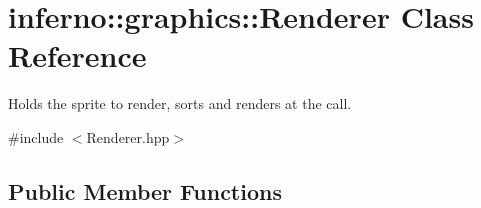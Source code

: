 \hypertarget{classinferno_1_1graphics_1_1_renderer}{}\section{inferno\+:\+:graphics\+:\+:Renderer Class Reference}
\label{classinferno_1_1graphics_1_1_renderer}


Holds the sprite to render, sorts and renders at the call.  




{\ttfamily \#include $<$Renderer.\+hpp$>$}

\subsection*{Public Member Functions}
